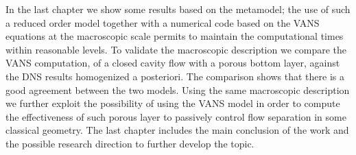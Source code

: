 In the last chapter we show some results based on the metamodel; the use of such a reduced order model together with a numerical code based on the VANS equations at the macroscopic scale permits to maintain the computational times within reasonable levels.
To validate the macroscopic description we compare the VANS computation, of a closed cavity flow with a porous bottom layer, against the DNS results homogenized a posteriori. The comparison shows that there is a good agreement between the two models.
Using the same macroscopic description we further exploit the possibility of using the VANS model in order to compute the effectiveness of such porous layer to passively control flow separation in some classical geometry.
The last chapter includes the main conclusion of the work and the possible research direction to further develop the topic.
